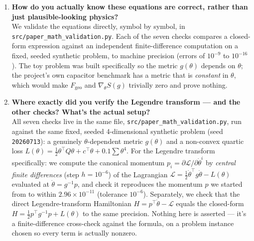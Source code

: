 \documentclass[11pt]{article}
\begin{document}
\begin{enumerate}[leftmargin=1.4em, itemsep=0.9em]

\item \textbf{How do you actually know these equations are correct, rather than just plausible-looking physics?}\\
We validate the equations directly, symbol by symbol, in \texttt{src/paper\_math\_validation.py}.
Each of the seven checks compares a closed-form expression against an independent
finite-difference computation on a fixed, seeded synthetic problem, to machine precision (errors
of $10^{-9}$ to $10^{-16}$). The toy problem was built specifically so the metric $g(\theta)$
depends on $\theta$; the project's own capacitor benchmark has a metric that is \emph{constant} in
$\theta$, which would make $F_{\mathrm{geo}}$ and $\nabla_\theta S(g)$ trivially zero and prove
nothing.

\item \textbf{Where exactly did you verify the Legendre transform --- and the other checks? What's the actual setup?}\\
All seven checks live in the same file, \texttt{src/paper\_math\_validation.py}, run against the
same fixed, seeded 4-dimensional synthetic problem (seed \texttt{20260713}): a genuinely
$\theta$-dependent metric $g(\theta)$ and a non-convex quartic loss
$L(\theta)=\tfrac12\theta^{\top}Q\theta+c^{\top}\theta+0.1\sum\theta^4$. For the Legendre
transform specifically: we compute the canonical momentum $p_i=\partial \mathcal L/\partial
\dot\theta^i$ by \emph{central finite differences} (step $h=10^{-6}$) of the Lagrangian
$\mathcal L=\tfrac12\dot\theta^{\top}g\dot\theta-L(\theta)$ evaluated at $\dot\theta=g^{-1}p$, and
check it reproduces the momentum $p$ we started from to within $2.96\times10^{-11}$ (tolerance
$10^{-6}$). Separately, we check that the direct Legendre-transform Hamiltonian
$H=p^{\top}\dot\theta-\mathcal L$ equals the closed-form $H=\tfrac12p^{\top}g^{-1}p+L(\theta)$ to
the same precision. Nothing here is asserted --- it's a finite-difference cross-check against the
formula, on a problem instance chosen so every term is actually nonzero.


\end{enumerate}
\end{document}
